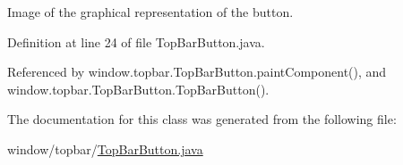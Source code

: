 Image of the graphical representation of the button. 



Definition at line 24 of file Top\-Bar\-Button.\-java.



Referenced by window.\-topbar.\-Top\-Bar\-Button.\-paint\-Component(), and window.\-topbar.\-Top\-Bar\-Button.\-Top\-Bar\-Button().



The documentation for this class was generated from the following file\-:\begin{DoxyCompactItemize}
\item 
window/topbar/\hyperlink{a00055}{Top\-Bar\-Button.\-java}\end{DoxyCompactItemize}
